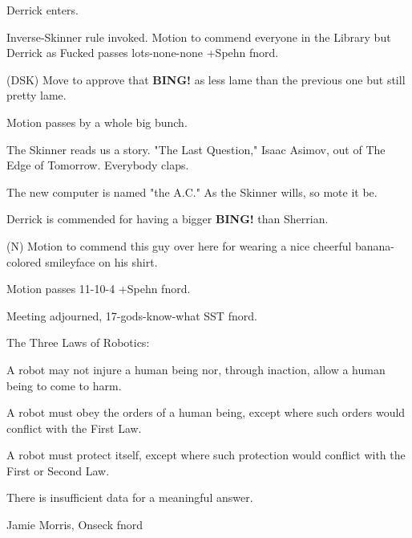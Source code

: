 \documentclass[12pt]{article}
\newcommand{\bing}{{\bf BING!} }
\begin{document}
Derrick enters.

Inverse-Skinner rule invoked. Motion to commend everyone in the Library but Derrick as Fucked passes lots-none-none +Spehn fnord.

(DSK) Move to approve that \bing as less lame than the previous one but still pretty lame.

Motion passes by a whole big bunch.

The Skinner reads us a story. "The Last Question," Isaac Asimov, out of The Edge of Tomorrow. Everybody claps.

The new computer is named "the A.C." As the Skinner wills, so mote it be.

Derrick is commended for having a bigger \bing than Sherrian.

(N) Motion to commend this guy over here for wearing a nice cheerful banana-colored smileyface on his shirt.

Motion passes 11-10-4 +Spehn fnord.

\vspace{12pt}

\noindent
Meeting adjourned, 17-gods-know-what SST fnord.

The Three Laws of Robotics:

A robot may not injure a human being nor, through inaction, allow a human being to come to harm.

A robot must obey the orders of a human being, except where such orders would conflict with the First Law.

A robot must protect itself, except where such protection would conflict with the First or Second Law.

\vspace{18pt}

\centerline{There is insufficient data for a meaningful answer.}
\centerline{Jamie Morris, Onseck fnord}
\end{document}
